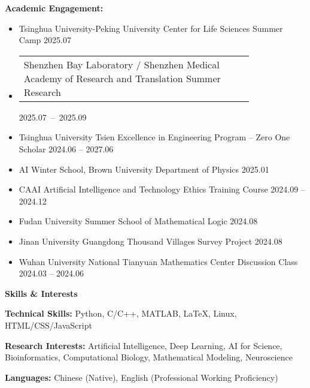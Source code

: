 \documentclass[11pt]{article}
\begin{document}
	\textbf{Academic Engagement:}
	\begin{itemize}[noitemsep, topsep=0pt, partopsep=0pt, parsep=0pt, leftmargin=*]
		\item Tsinghua University-Peking University Center for Life Sciences Summer Camp \hfill 2025.07
		\item \begin{tabular}[c]{@{}p{0.8\linewidth}@{}}Shenzhen Bay Laboratory / Shenzhen Medical Academy of Research and Translation Summer Research\end{tabular} \hfill \mbox{2025.07 -- 2025.09}
		\item Tsinghua University Tsien Excellence in Engineering Program -- Zero One Scholar \hfill 2024.06 -- 2027.06
		\item AI Winter School, Brown University Department of Physics \hfill 2025.01
		\item CAAI Artificial Intelligence and Technology Ethics Training Course \hfill 2024.09 -- 2024.12
		\item Fudan University Summer School of Mathematical Logic \hfill 2024.08
		\item Jinan University Guangdong Thousand Villages Survey Project \hfill 2024.08
		\item Wuhan University National Tianyuan Mathematics Center Discussion Class \hfill 2024.03 -- 2024.06
	\end{itemize}
	
	\vspace{12pt}
	
	\begin{center}
		\textbf{\large Skills \& Interests}
	\end{center}
	\textbf{Technical Skills:} Python, C/C++, MATLAB, LaTeX, Linux, HTML/CSS/JavaScript
	
	\textbf{Research Interests:} Artificial Intelligence, Deep Learning, AI for Science, Bioinformatics, Computational Biology, Mathematical Modeling, Neuroscience
	
	\textbf{Languages:} Chinese (Native), English (Professional Working Proficiency)
	
\end{document}

